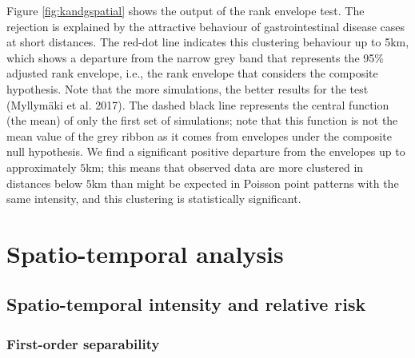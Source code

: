 Figure \ref{fig:kandgspatial} shows the output of the rank envelope test. The rejection is explained by the attractive behaviour of gastrointestinal disease cases at short distances. The red-dot line indicates this clustering behaviour up to 5km, which shows a departure from the narrow grey band that represents the 95\% adjusted rank envelope, i.e., the rank envelope that considers the composite hypothesis. Note that the more simulations, the better results for the test (Myllymäki et al. 2017). The dashed black line represents the central function (the mean) of only the first set of simulations; note that this function is not the mean value of the grey ribbon as it comes from envelopes under the composite null hypothesis. We find a significant positive departure from the envelopes up to approximately \(5\)km; this means that observed data are more clustered in distances below \(5\)km than might be expected in Poisson point patterns with the same intensity, and this clustering is statistically significant.

\hypertarget{spatio-temporal-analysis}{%
\section{Spatio-temporal analysis}\label{spatio-temporal-analysis}}

\hypertarget{spatio-temporal-intensity-and-relative-risk}{%
\subsection{Spatio-temporal intensity and relative risk}\label{spatio-temporal-intensity-and-relative-risk}}

\hypertarget{first-order-separability}{%
\subsubsection{First-order separability}\label{first-order-separability}}

